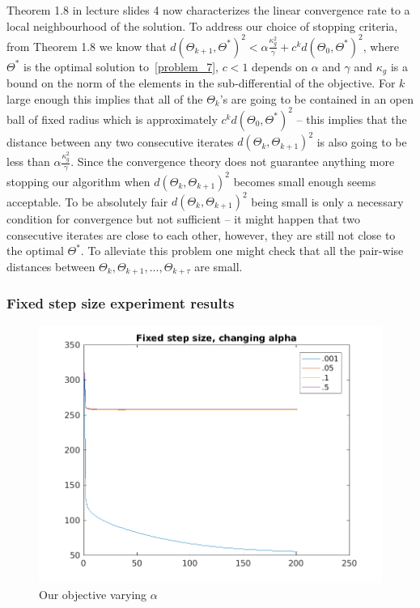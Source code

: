 \documentclass{article}
\newcommand{\0}{\mathrm{0}}
\newcommand{\1}{\mathrm{1}}
\newcommand{\red}[1]{{\color{red}{#1}}}
\begin{document}
Theorem 1.8 in lecture slides 4 now characterizes the linear convergence rate to a local neighbourhood of the solution. To address our choice of stopping criteria, from Theorem 1.8 we know that  $d(\Theta_{k+1},\Theta^*)^2 < \alpha\frac{\kappa_g^2}{\gamma} + c^kd(\Theta_0,\Theta^*)^2$, where $\Theta^*$ is the optimal solution to~\ref{problem_7}, $c<1$ depends on $\alpha$ and $\gamma$ and $\kappa_g$ is a bound on the norm of the elements in the sub-differential of the objective. For $k$ large enough this implies that all of the $\Theta_{k}$'s are going to be contained in an open ball of fixed radius which is approximately $c^kd(\Theta_0,\Theta^*)^2$ -- this implies that the distance between any two consecutive iterates $d(\Theta_k,\Theta_{k+1})^2$ is also going to be less than $\alpha\frac{\kappa_g^2}{\gamma}$. Since the convergence theory does not guarantee anything more stopping our algorithm when $d(\Theta_k,\Theta_{k+1})^2$ becomes small enough seems acceptable. To be absolutely fair $d(\Theta_k,\Theta_{k+1})^2$ being small is only a necessary condition for convergence but not sufficient -- it might happen that two consecutive iterates are close to each other, however, they are still not close to the optimal $\Theta^*$. To alleviate this problem one might check that all the pair-wise distances between $\Theta_k,\Theta_{k+1},...,\Theta_{k+\tau}$ are small.

\subsubsection{Fixed step size experiment results}
\red{TODO: clean up}

\begin{figure}
  \includegraphics{fixed-step-alpha.png}
  \caption{Our objective varying $\alpha$}
\end{figure}
\end{document}
